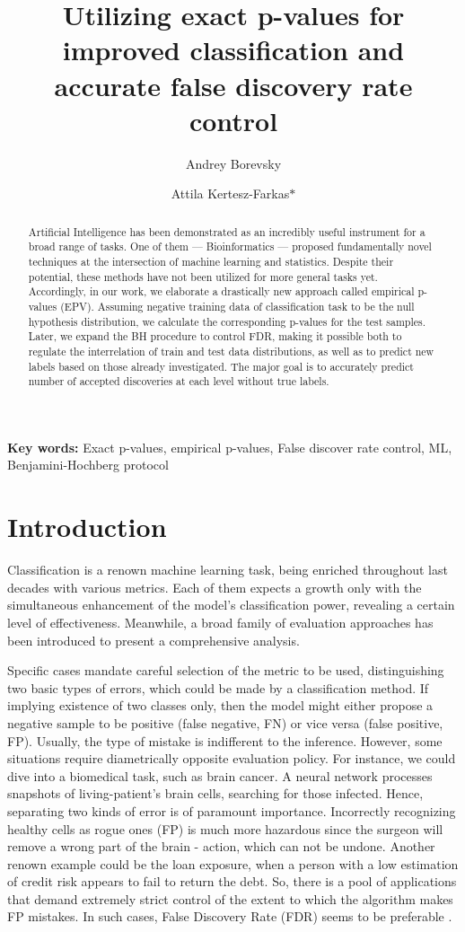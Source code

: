 \documentclass{article}
\author{Andrey Borevsky}
\author{Attila Kertesz-Farkas$\ast$}
\affil{Laboratory on AI for Computational Biology, Faculty of Computer Science, HSE University,  11 Pokrovsky Bvld., Moscow 109028, Russian Federation}
\title{Utilizing exact p-values for improved classification and accurate false discovery rate control}
\begin{document}
\maketitle

\begin{abstract}
Artificial Intelligence has been demonstrated as an incredibly useful instrument for a broad range of tasks. One of them — Bioinformatics — proposed fundamentally novel techniques at the intersection of machine learning and statistics. Despite their potential, these methods have not been utilized for more general tasks yet. Accordingly, in our work, we elaborate a drastically new approach called empirical p-values (EPV). Assuming negative training data of classification task to be the null hypothesis distribution, we calculate the corresponding p-values for the test samples. Later, we expand the BH procedure to control FDR, making it possible both to regulate the interrelation of train and test data distributions, as well as to predict new labels based on those already investigated. The major goal is to accurately predict number of accepted discoveries at each level without true labels.


\end{abstract}
\textbf{Key words:} Exact p-values, empirical p-values, False discover rate control, ML, Benjamini-Hochberg protocol

\section{Introduction}

Classification is a renown machine learning task, being enriched throughout last decades with various metrics. Each of them expects a growth only with the simultaneous enhancement of the model’s classification power, revealing a certain level of effectiveness. Meanwhile, a broad family of evaluation approaches has been introduced to present a comprehensive analysis. 

Specific cases mandate careful selection of the metric to be used, distinguishing two basic types of errors, which could be made by a classification method. If implying existence of two classes only, then the model might either propose a negative sample to be positive (false negative, FN) or vice versa (false positive, FP). Usually, the type of mistake is indifferent to the inference. However, some situations require diametrically opposite evaluation policy. For instance, we could dive into a biomedical task, such as brain cancer. A neural network processes snapshots of living-patient’s brain cells, searching for those infected. Hence, separating two kinds of error is of paramount importance. Incorrectly recognizing healthy cells as rogue ones (FP) is much more hazardous since the surgeon will remove a wrong part of the brain - action, which can not be undone. Another renown example could be the loan exposure, when a person with a low estimation of credit risk appears to fail to return the debt. So, there is a pool of applications that demand extremely strict control of the extent to which the algorithm makes FP mistakes. In such cases, False Discovery Rate (FDR) seems to be preferable \cite{peaks_de_novo}.
\end{document}
